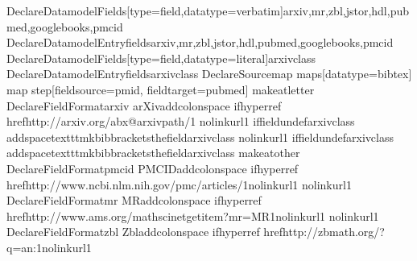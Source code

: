 \documentclass[letterpaper,10pt,english]{sphinxmanual}
\begin{document}
%
\begin{sphinxVerbatim}[commandchars=\\\{\}]
\PYGZbs{}DeclareDatamodelFields[type=field,datatype=verbatim]\PYGZob{}arxiv,mr,zbl,jstor,hdl,pubmed,googlebooks,pmcid\PYGZcb{}
\PYGZbs{}DeclareDatamodelEntryfields\PYGZob{}arxiv,mr,zbl,jstor,hdl,pubmed,googlebooks,pmcid\PYGZcb{}
\PYGZbs{}DeclareDatamodelFields[type=field,datatype=literal]\PYGZob{}arxivclass\PYGZcb{}
\PYGZbs{}DeclareDatamodelEntryfields\PYGZob{}arxivclass\PYGZcb{}
\PYGZbs{}DeclareSourcemap\PYGZob{}
\PYGZbs{}maps[datatype=bibtex]\PYGZob{}
    \PYGZbs{}map\PYGZob{}
    \PYGZbs{}step[fieldsource=pmid, fieldtarget=pubmed]
    \PYGZcb{}
\PYGZcb{}
\PYGZcb{}
\PYGZbs{}makeatletter
\PYGZbs{}DeclareFieldFormat\PYGZob{}arxiv\PYGZcb{}\PYGZob{}\PYGZpc{}
arXiv\PYGZbs{}addcolon\PYGZbs{}space
\PYGZbs{}ifhyperref
    \PYGZob{}\PYGZbs{}href\PYGZob{}http://arxiv.org/\PYGZbs{}abx@arxivpath/\PYGZsh{}1\PYGZcb{}\PYGZob{}\PYGZpc{}
    \PYGZbs{}nolinkurl\PYGZob{}\PYGZsh{}1\PYGZcb{}\PYGZpc{}
    \PYGZbs{}iffieldundef\PYGZob{}arxivclass\PYGZcb{}
        \PYGZob{}\PYGZcb{}
        \PYGZob{}\PYGZbs{}addspace\PYGZbs{}texttt\PYGZob{}\PYGZbs{}mkbibbrackets\PYGZob{}\PYGZbs{}thefield\PYGZob{}arxivclass\PYGZcb{}\PYGZcb{}\PYGZcb{}\PYGZcb{}\PYGZcb{}\PYGZcb{}
    \PYGZob{}\PYGZbs{}nolinkurl\PYGZob{}\PYGZsh{}1\PYGZcb{}
    \PYGZbs{}iffieldundef\PYGZob{}arxivclass\PYGZcb{}
    \PYGZob{}\PYGZcb{}
    \PYGZob{}\PYGZbs{}addspace\PYGZbs{}texttt\PYGZob{}\PYGZbs{}mkbibbrackets\PYGZob{}\PYGZbs{}thefield\PYGZob{}arxivclass\PYGZcb{}\PYGZcb{}\PYGZcb{}\PYGZcb{}\PYGZcb{}\PYGZcb{}
\PYGZbs{}makeatother
\PYGZbs{}DeclareFieldFormat\PYGZob{}pmcid\PYGZcb{}\PYGZob{}\PYGZpc{}
PMCID\PYGZbs{}addcolon\PYGZbs{}space
\PYGZbs{}ifhyperref
    \PYGZob{}\PYGZbs{}href\PYGZob{}http://www.ncbi.nlm.nih.gov/pmc/articles/\PYGZsh{}1\PYGZcb{}\PYGZob{}\PYGZbs{}nolinkurl\PYGZob{}\PYGZsh{}1\PYGZcb{}\PYGZcb{}\PYGZcb{}
    \PYGZob{}\PYGZbs{}nolinkurl\PYGZob{}\PYGZsh{}1\PYGZcb{}\PYGZcb{}\PYGZcb{}
\PYGZbs{}DeclareFieldFormat\PYGZob{}mr\PYGZcb{}\PYGZob{}\PYGZpc{}
MR\PYGZbs{}addcolon\PYGZbs{}space
\PYGZbs{}ifhyperref
    \PYGZob{}\PYGZbs{}href\PYGZob{}http://www.ams.org/mathscinet\PYGZhy{}getitem?mr=MR\PYGZsh{}1\PYGZcb{}\PYGZob{}\PYGZbs{}nolinkurl\PYGZob{}\PYGZsh{}1\PYGZcb{}\PYGZcb{}\PYGZcb{}
    \PYGZob{}\PYGZbs{}nolinkurl\PYGZob{}\PYGZsh{}1\PYGZcb{}\PYGZcb{}\PYGZcb{}
\PYGZbs{}DeclareFieldFormat\PYGZob{}zbl\PYGZcb{}\PYGZob{}\PYGZpc{}
Zbl\PYGZbs{}addcolon\PYGZbs{}space
\PYGZbs{}ifhyperref
    \PYGZob{}\PYGZbs{}href\PYGZob{}http://zbmath.org/?q=an:\PYGZsh{}1\PYGZcb{}\PYGZob{}\PYGZbs{}nolinkurl\PYGZob{}\PYGZsh{}1\PYGZcb{}\PYGZcb{}\PYGZcb{}

\end{sphinxVerbatim}
\end{document}
